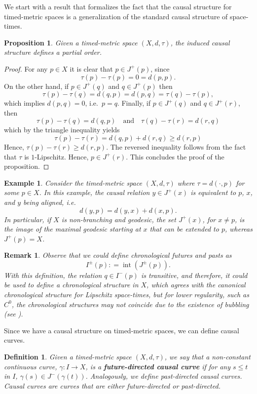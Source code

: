 \documentclass[a4paper,12pt,reqno]{amsart}
\theoremstyle{plain}
\newtheorem{prop}[thm]{Proposition}
\newtheorem{defn}[thm]{Definition}
\newtheorem{rmrk}[thm]{Remark}
\newtheorem{example}[thm]{Example}
\newcommand{\be}{\begin{equation}}
\newcommand{\ee}{\end{equation}}
\DeclareMathOperator{\interior}{int}
\begin{document}
We start with a result that formalizes the fact that the causal structure for timed-metric spaces is a generalization of the standard causal structure of space-times.

\begin{prop}
Given a timed-metric space $(X,d,\tau)$, the induced causal structure defines a partial order.
\end{prop}

\begin{proof}
For any $p\in X$ it is clear that $p\in J^+(p)$, since 
\[
\tau(p) - \tau(p) = 0 = d(p,p).
\]
On the other hand, if $p\in J^+(q)$ and $q\in J^+(p)$ then 
\[
\tau(p)-\tau(q) = d(q,p) = d(p,q) = \tau(q)-\tau(p),
\]
which implies $d(p,q) = 0$, i.e.\ $p=q$. Finally, if $p \in J^+(q)$ and $q\in J^+(r)$,  then
\[
\tau(p)-\tau(q) = d(q,p) \quad \text{and}\quad 
\tau(q)-\tau(r) = d(r,q)
\]
which by the triangle inequality yields
\[
\tau(p)-\tau(r) = d(q,p)+d(r,q) \geq d(r,p)
\]
Hence, $\tau(p)-\tau(r) \geq d(r,p)$. The reversed inequality 
follows from the fact that $\tau$ is $1$-Lipschitz. Hence, $p \in J^+(r)$. This concludes the proof of the proposition.
\end{proof}

\begin{example}
Consider the timed-metric space $(X,d,\tau)$ where $\tau = d(\cdot,p)$ for some $p \in X$. In this example, the causal relation $y\in J^+(x)$ is equivalent to $p$, $x$, and $y$ being aligned, i.e. 
\be
d(y,p)=d(y,x)+d(x,p).
\ee
In particular, if $X$ is non-branching and geodesic, the set $J^+(x)$, for $x\neq p$, is the image of the maximal geodesic starting at $x$ that can be extended to $p$, whereas $J^+(p) = X$.    
\end{example}



\begin{rmrk}
Observe that we could define chronological futures and pasts as
\[
I^\pm(p) : = \interior(J^\pm(p)). 
\]
With this definition, the relation $q\in I^-(p)$ is transitive, and therefore, it could be used to define a chronological structure in $X$, which
agrees with the canonical chronological structure for Lipschitz space-times,
but for lower regularity, such as $C^0$, 
the chronological structures may not coincide due to the existence of bubbling (see \cite{Ling-Aspects}).    
\end{rmrk} 



Since we have a causal structure on timed-metric spaces, we can define causal curves.
\begin{defn}
Given a timed-metric space $(X,d,\tau)$, 
we say that a non-constant continuous curve, $\gamma\colon I\to X$, is a \textbf{future-directed causal curve} if for any $s\leq t$ in $I$, $\gamma(s) \in J^-(\gamma(t))$. Analogously, we define
past-directed causal curves. Causal curves are curves that are either future-directed or past-directed. 
\end{defn}
\end{document}
